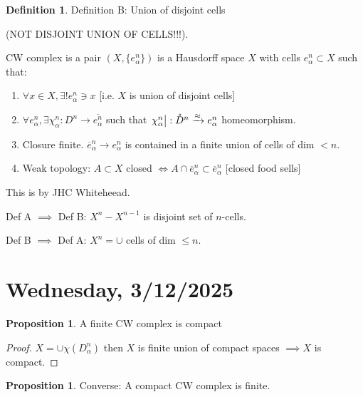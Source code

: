 \documentclass{article}
\theoremstyle{definition}
\newtheorem*{definition}{Definition}
\newtheorem{proposition}[theorem]{Proposition}
\begin{document}
    \begin{definition}
        Definition B: Union of disjoint cells
        
        (NOT DISJOINT UNION OF CELLS!!!).

        CW complex is a pair \((X,\{ e^n_\alpha \} )\) is a Hausdorff space \(X\) with cells \(e^n_\alpha \subset X\) such that:
        
        \begin{enumerate}[label=\arabic*)]
            \item \(\forall x\in X, \exists ! e^n_\alpha \ni x\) [i.e. \(X\) is union of disjoint cells]
            \item \(\forall e^n_\alpha , \exists \chi_\alpha^n: D^n \to \overline{e^n_\alpha}\) such that \(\eval{\chi^n_\alpha}: \mathring{D}^n \xrightarrow{\approx} e^n_\alpha\) homeomorphism.
            \item Closure finite. \(\overline{e}^n_\alpha \to e^n_\alpha\) is contained in a finite union of cells of dim \(< n\).
            \item Weak topology: \(A \subset X\) closed \(\iff A \cap \overline{e}^n_\alpha \subset \overline{e}^n_\alpha\) [closed food sells]  
        \end{enumerate} 
    \end{definition}

    This is by JHC Whiteheead.

    Def A \(\implies\) Def B: \(X^n - X^{n-1}\) is disjoint set of \(n\)-cells.
    
    Def B \(\implies\) Def A: \(X^n = \cup\) cells of dim \(\leq n\). 

    \section*{Wednesday, 3/12/2025}

    \begin{proposition}
        A finite CW complex is compact
    \end{proposition}

    \begin{proof}
        \(X = \cup \chi(D_\alpha^n)\) then \(X\) is finite union of compact spaces \(\implies X\) is compact.
    \end{proof}

    \begin{proposition}
        Converse: A compact CW complex is finite.
    \end{proposition}
\end{document}
